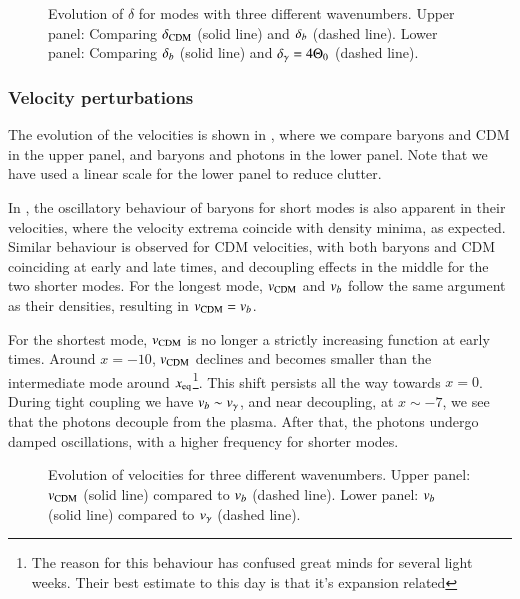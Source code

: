 \begin{figure}[ht!]
    \caption{Evolution of $\delta$ for modes with three different wavenumbers. Upper panel: Comparing $\delta_\mathrm{CDM}$ (solid line) and $\delta_b$ (dashed line). Lower panel: Comparing $\delta_b$ (solid line) and $\delta_\gamma=4\Theta_0$ (dashed line).}
    \label{fig:M3:results:deltas}
\end{figure}


\subsubsection{Velocity perturbations}\label{sssec:M3:results:velocity_perturbations}
The evolution of the velocities is shown in , where we compare baryons and CDM in the upper panel, and baryons and photons in the lower panel. Note that we have used a linear scale for the lower panel to reduce clutter.   

In , the oscillatory behaviour of baryons for short modes is also apparent in their velocities, where the velocity extrema coincide with density minima, as expected. Similar behaviour is observed for CDM velocities, with both baryons and CDM coinciding at early and late times, and decoupling effects in the middle for the two shorter modes. For the longest mode, $v_\mathrm{CDM}$ and $v_b$ follow the same argument as their densities, resulting in $v_\mathrm{CDM}=v_b$. 

For the shortest mode, $v_\mathrm{CDM}$ is no longer a strictly increasing function at early times. Around $x=-10$, $v_\mathrm{CDM}$ declines and becomes smaller than the intermediate mode around $x_\mathrm{eq}$\footnote{The reason for this behaviour has confused great minds for several light weeks. Their best estimate to this day is that it's expansion related}. This shift persists all the way towards $x=0$. During tight coupling we have $v_b\sim v_\gamma$, and near decoupling, at $x\sim-7$, we see that the photons decouple from the plasma. After that, the photons undergo damped oscillations, with a higher frequency for shorter modes. 

\begin{figure}[ht!]
    \caption{Evolution of velocities for three different wavenumbers. Upper panel: $v_\mathrm{CDM}$ (solid line) compared to $v_b$ (dashed line). Lower panel: $v_b$ (solid line) compared to $v_\gamma$ (dashed line).}
    \label{fig:M3:results:vels}
\end{figure}


